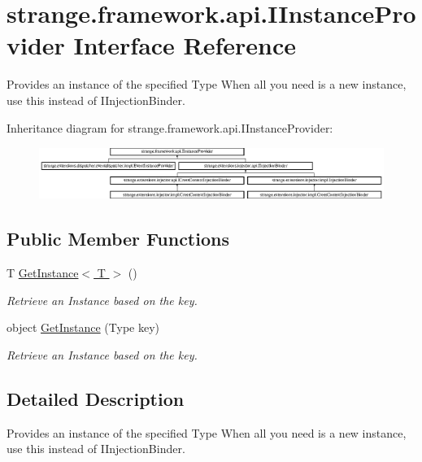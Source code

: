 \hypertarget{interfacestrange_1_1framework_1_1api_1_1_i_instance_provider}{\section{strange.\-framework.\-api.\-I\-Instance\-Provider Interface Reference}
\label{interfacestrange_1_1framework_1_1api_1_1_i_instance_provider}
}


Provides an instance of the specified Type When all you need is a new instance, use this instead of I\-Injection\-Binder.  


Inheritance diagram for strange.\-framework.\-api.\-I\-Instance\-Provider\-:\begin{figure}[H]
\begin{center}
\leavevmode
\includegraphics[height=1.696970cm]{interfacestrange_1_1framework_1_1api_1_1_i_instance_provider}
\end{center}
\end{figure}
\subsection*{Public Member Functions}
\begin{DoxyCompactItemize}
\item 
T \hyperlink{interfacestrange_1_1framework_1_1api_1_1_i_instance_provider_a0bec917157343a46d675ad3a8b6ad65c}{Get\-Instance$<$ T $>$} ()
\begin{DoxyCompactList}\small\item\em Retrieve an Instance based on the key. \end{DoxyCompactList}\item 
object \hyperlink{interfacestrange_1_1framework_1_1api_1_1_i_instance_provider_a6e9b3f0300c397c2005204211647a653}{Get\-Instance} (Type key)
\begin{DoxyCompactList}\small\item\em Retrieve an Instance based on the key. \end{DoxyCompactList}\end{DoxyCompactItemize}


\subsection{Detailed Description}
Provides an instance of the specified Type When all you need is a new instance, use this instead of I\-Injection\-Binder. 

